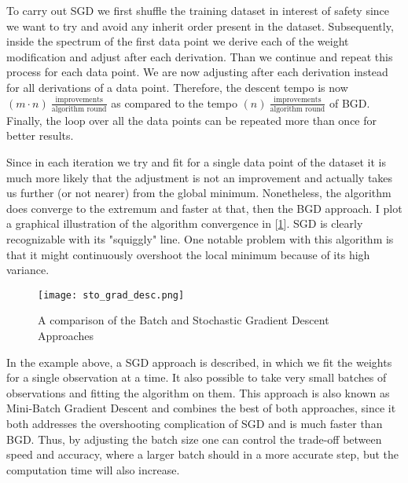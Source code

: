 		\par
	
		To carry out SGD we first shuffle the training dataset in interest of safety since we want to try and avoid any inherit order present in the dataset. Subsequently, inside the spectrum of the first data point we derive each of the weight modification and adjust after each derivation. Than we continue and repeat this process for each data point. We are now adjusting after each derivation instead for all derivations of a data point. Therefore, the descent tempo is now $ (m \cdot n) \ \frac{\text{improvements}}{\text{algorithm round}}$ as compared to the tempo $(n) \ \frac{\text{improvements}}{\text{algorithm round}}$ of BGD. Finally, the loop over all the data points can be repeated more than once for better results.
		
		\par
		
		Since in each iteration we try and fit for a single data point of the dataset it is much more likely that the adjustment is not an improvement and actually takes us further (or not nearer) from the global minimum. Nonetheless, the algorithm does converge to the extremum and faster at that, then the BGD approach. I plot a graphical illustration of the algorithm convergence in [\ref{ann_sto_grad_desc}]. SGD is clearly recognizable with its "squiggly" line. One notable problem with this algorithm is that it might continuously overshoot the local minimum because of its high variance.
		
		\begin{figure}[H]
			\centering
			\captionsetup{width=0.8\textwidth}
			\texttt{[image: sto\_grad\_desc.png]}
			\caption[Batch and Stochastic Gradient Descent]{
				\footnotesize{
					A comparison of the Batch and Stochastic Gradient Descent Approaches 
				}
			} 
			\label{ann_sto_grad_desc}
		\end{figure}
	
		In the example above, a SGD approach is described, in which we fit the weights for a single observation at a time. It also possible to take very small batches of observations and fitting the algorithm on them. This approach is also known as Mini-Batch Gradient Descent and combines the best of both approaches, since it both addresses the overshooting complication of SGD and is much faster than BGD. Thus, by adjusting the batch size one can control the trade-off between speed and accuracy, where a larger batch should in a more accurate step, but the computation time will also increase. 
		
